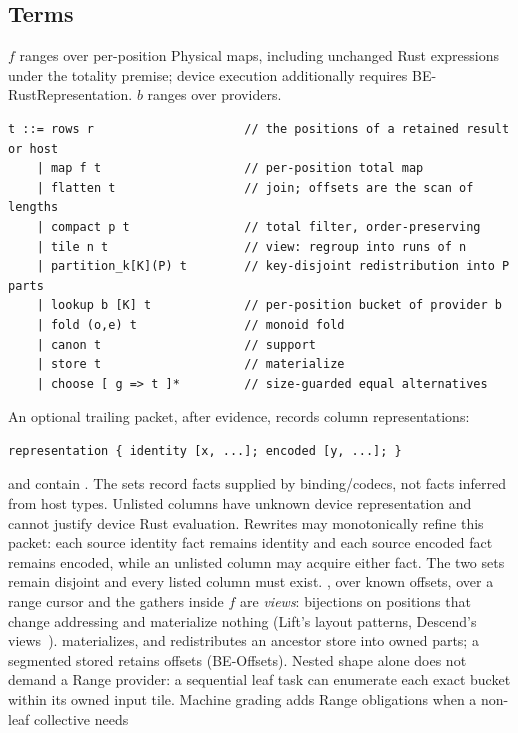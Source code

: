 \subsection{Terms}
$f$ ranges over per-position Physical maps, including unchanged Rust
expressions under the totality premise; device execution additionally requires
BE-RustRepresentation. $b$ ranges over providers.
\begin{lstlisting}
t ::= rows r                     // the positions of a retained result or host
    | map f t                    // per-position total map
    | flatten t                  // join; offsets are the scan of lengths
    | compact p t                // total filter, order-preserving
    | tile n t                   // view: regroup into runs of n
    | partition_k[K](P) t        // key-disjoint redistribution into P parts
    | lookup b [K] t             // per-position bucket of provider b
    | fold (o,e) t               // monoid fold
    | canon t                    // support
    | store t                    // materialize
    | choose [ g => t ]*         // size-guarded equal alternatives
\end{lstlisting}
An optional trailing packet, after evidence, records column representations:
\begin{lstlisting}
representation { identity [x, ...]; encoded [y, ...]; }
\end{lstlisting}
 and  contain
. The sets
record facts supplied by binding/codecs, not facts inferred from host types.
Unlisted columns have unknown device representation and cannot justify
device Rust evaluation. Rewrites may monotonically refine this packet:
each source identity fact remains identity and each source encoded fact
remains encoded, while an unlisted column may acquire either fact.
The two sets remain disjoint and every listed column must exist.
,  over known offsets,  over a range
cursor and the gathers inside $f$ are \emph{views}: bijections on positions
that change addressing and materialize nothing (Lift's layout patterns,
Descend's views~\cite{paper-lift,paper-descend}).  materializes,
and  redistributes an ancestor store into owned parts;
a segmented stored  retains offsets (BE-Offsets).
Nested shape alone does not demand a Range provider: a sequential leaf
task can enumerate each exact bucket within its owned input tile.
Machine grading adds Range obligations when a non-leaf collective needs
